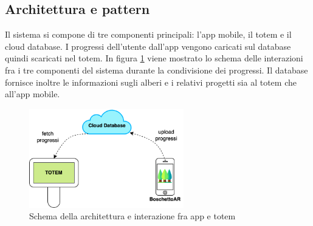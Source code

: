 \subsection{Architettura e pattern}
Il sistema si compone di tre componenti principali: l'app mobile, il totem e il cloud database. I progressi dell'utente dall'app vengono caricati sul database quindi scaricati nel totem. In figura \ref{fig:communication-schema} viene mostrato lo schema delle interazioni fra i tre componenti del sistema durante la condivisione dei progressi.
Il database fornisce inoltre le informazioni sugli alberi e i relativi progetti sia al totem che all'app mobile.
\begin{figure} [h]
    \centering
    \includegraphics[width=0.6\textwidth]{img/totem/arch-totem-app-dati.png}
    \caption{Schema della architettura e interazione fra app e totem}
    \label{fig:communication-schema}
\end{figure}

